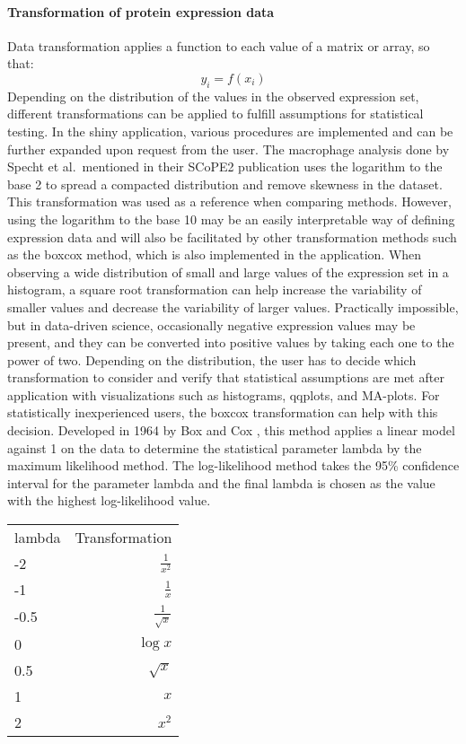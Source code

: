 \documentclass[
]{article}
\begin{document}
\hypertarget{transformation-of-protein-expression-data}{%
\paragraph{Transformation of protein expression
data}\label{transformation-of-protein-expression-data}}

Data transformation applies a function to each value of a matrix or
array, so that: \[
y_i = f(x_i)
\] Depending on the distribution of the values in the observed
expression set, different transformations can be applied to fulfill
assumptions for statistical testing. In the shiny application, various
procedures are implemented and can be further expanded upon request from
the user. The macrophage analysis done by Specht et al.~mentioned in
their SCoPE2 publication \citep{Specht2021} uses the logarithm to the
base 2 to spread a compacted distribution and remove skewness in the
dataset. This transformation was used as a reference when comparing
methods. However, using the logarithm to the base 10 may be an easily
interpretable way of defining expression data and will also be
facilitated by other transformation methods such as the boxcox method,
which is also implemented in the application. When observing a wide
distribution of small and large values of the expression set in a
histogram, a square root transformation can help increase the
variability of smaller values and decrease the variability of larger
values. Practically impossible, but in data-driven science, occasionally
negative expression values may be present, and they can be converted
into positive values by taking each one to the power of two. Depending
on the distribution, the user has to decide which transformation to
consider and verify that statistical assumptions are met after
application with visualizations such as histograms, qqplots, and
MA-plots. For statistically inexperienced users, the boxcox
transformation can help with this decision. Developed in 1964 by Box and
Cox \citep{Sakia1992}, this method applies a linear model against 1 on
the data to determine the statistical parameter lambda by the maximum
likelihood method. The log-likelihood method takes the 95\% confidence
interval for the parameter lambda and the final lambda is chosen as the
value with the highest log-likelihood value.

\begin{center}
\begin{tabular}{l r}
lambda & Transformation \\
-2 & $\frac{1}{x^2}$ \\
-1 & $\frac{1}{x}$ \\
-0.5 & $\frac{1}{\sqrt{x}}$ \\
0 & $\log{x}$ \\
0.5 & $\sqrt{x}$ \\
1 & $x$ \\
2 & $x^2$
\end{tabular}
\end{center}
\end{document}
